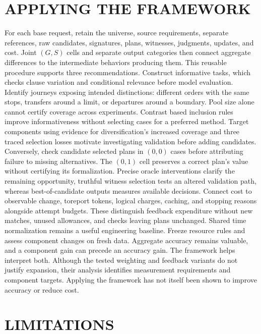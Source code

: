 \documentclass[a4paper,twoside]{article}
\begin{document}
\section{\uppercase{Applying the Framework}}
\label{sec:recommendations}

\noindent For each base request, retain the universe, source requirements, separate references, raw candidates, signatures, plans, witnesses, judgments, updates, and cost. Joint $(G,S)$ cells and separate output categories then connect aggregate differences to the intermediate behaviors producing them. This reusable procedure supports three recommendations.
Construct informative tasks, which  checks clause variation and conditional relevance before model evaluation. Identify journeys exposing intended distinctions: different orders with the same stops, transfers around a limit, or departures around a boundary. Pool size alone cannot certify coverage across experiments. Contrast based inclusion rules improve informativeness without selecting cases for a preferred method.
Target components using evidence for diversification's increased coverage and three traced selection losses motivate investigating validation before adding candidates. Conversely, check candidate selected plans in $(0,0)$ cases before attributing failure to missing alternatives.
The $(0,1)$ cell preserves a correct plan's value without certifying its formalization. Precise oracle interventions clarify the remaining opportunity, truthful witness selection tests an altered validation path, whereas best-of-candidate outputs measures available decisions.
Connect cost to observable change, toreport tokens, logical charges, caching, and stopping reasons alongside attempt budgets. These distinguish feedback expenditure without new matches, unused allowances, and checks leaving plans unchanged. Shared time normalization remains a useful engineering baseline. Freeze resource rules and assess component changes on fresh data.
Aggregate accuracy remains valuable, and a component gain can precede an accuracy gain. The framework helps interpret both. Although the tested weighting and feedback variants do not justify expansion, their analysis identifies measurement requirements and component targets. Applying the framework has not itself been shown to improve accuracy or reduce cost.



\section{\uppercase{Limitations}}
\label{sec:limitations}
\end{document}
